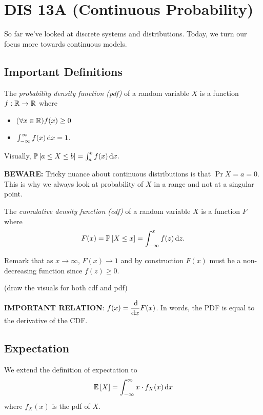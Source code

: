 \section{DIS 13A (Continuous Probability)}

So far we've looked at discrete systems and distributions. Today, we turn our focus more towards continuous models. 

\subsection{Important Definitions}

\begin{definition}
    The \textit{probability density function (pdf)} of a random variable $X$ is a function $f: \operatorname{\mathbb{R}} \to \operatorname{\mathbb{R}}$ where \begin{itemize}
        \item ($\forall x \in \operatorname{\mathbb{R}}) f(x) \ge 0$
        \item $\int_{-\infty}^{\infty} f(x) \operatorname{d\!} x = 1$.
    \end{itemize}
\end{definition}

Visually, $\mathbb{P}\left[ a \le X \le b \right] = \int_{a}^{b} f(x) \operatorname{d\!} x.$

\textbf{BEWARE:} Tricky nuance about continuous distributions is that $\Pr{X = a} = 0$. This is why we always look at probability of $X$ in a range and not at a singular point. 

\begin{definition}
    The \textit{cumulative density function (cdf)} of a random variable $X$ is a function $F$ where \[ F(x) = \mathbb{P}\left[ X \le x \right] = \int_{-\infty}^{x} f(z) \operatorname{d\!} z. \]
\end{definition}

Remark that as $x \to \infty$, $F(x) \to 1$ and by construction $F(x)$ must be a non-decreasing function since $f(z) \ge 0$. 

(draw the visuals for both cdf and pdf)

\textbf{IMPORTANT RELATION}: $\displaystyle f(x) = \frac{\operatorname{d\!}}{\operatorname{d\!} x} F(x)$. In words, the PDF is equal to the derivative of the CDF. 

\subsection{Expectation}
We extend the definition of expectation to \[ \mathbb{E}\left[ X \right] = \int_{-\infty}^{\infty} x \cdot f_{X}(x) \operatorname{d\!} x \] where $f_X(x)$ is the pdf of $X$. 

